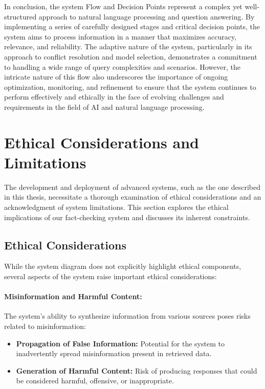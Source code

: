 In conclusion, the system Flow and Decision Points represent a complex yet well-structured approach to natural language processing and question answering.
By implementing a series of carefully designed stages and critical decision points, the system aims to process information in a manner that maximizes accuracy, relevance, and reliability.
The adaptive nature of the system, particularly in its approach to conflict resolution and model selection, demonstrates a commitment to handling a wide range of query complexities and scenarios.
However, the intricate nature of this flow also underscores the importance of ongoing optimization, monitoring, and refinement to ensure that the system continues to perform effectively and ethically in the face of evolving challenges and requirements in the field of AI and natural language processing.

\section{Ethical Considerations and Limitations}\label{sec:ethical-considerations-and-limitations}
The development and deployment of advanced systems, such as the one described in this thesis, necessitate a thorough examination of ethical considerations and an acknowledgment of system limitations.
This section explores the ethical implications of our fact-checking system and discusses its inherent constraints.

\subsection{Ethical Considerations}\label{subsec:ethical-considerations}
While the system diagram does not explicitly highlight ethical components, several aspects of the system raise important ethical considerations:

\paragraph{Misinformation and Harmful Content:}\label{subsubsec:misinformation-and-harmful-content}
The system's ability to synthesize information from various sources poses risks related to misinformation:
\begin{itemize}
    \item \textbf{Propagation of False Information:} Potential for the system to inadvertently spread misinformation present in retrieved data.
    \item \textbf{Generation of Harmful Content:} Risk of producing responses that could be considered harmful, offensive, or inappropriate.
\end{itemize}

